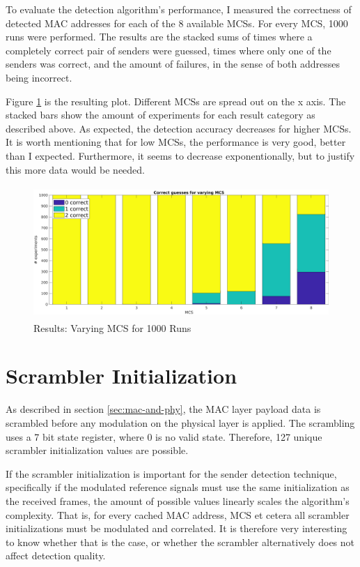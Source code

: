 To evaluate the detection algorithm's performance, I measured the correctness of detected \gls{MAC} addresses for each of the 8 available \glspl{MCS}. For every \gls{MCS}, 1000 runs were performed. The results are the stacked sums of times where a completely correct pair of senders were guessed, times where only one of the senders was correct, and the amount of failures, in the sense of both addresses being incorrect.

Figure \ref{fig:vary_mcs} is the resulting plot. Different \glspl{MCS} are spread out on the x axis. The stacked bars show the amount of experiments for each result category as described above. As expected, the detection accuracy decreases for higher \glspl{MCS}. It is worth mentioning that for low \glspl{MCS}, the performance is very good, better than I expected. Furthermore, it seems to decrease exponentionally, but to justify this more data would be needed.

\begin{figure}[H]
	\centering
	\includegraphics[height=5cm]{gfx/plots/mcs}
	\caption{Results: Varying MCS for 1000 Runs}
	\label{fig:vary_mcs}
\end{figure}



\section{Scrambler Initialization}\label{sec:ex-scrambler}

As described in section \ref{sec:mac-and-phy}, the \gls{MAC} layer payload data is scrambled before any modulation on the physical layer is applied. The scrambling uses a 7 bit state register, where 0 is no valid state. Therefore, 127 unique scrambler initialization values are possible.

If the scrambler initialization is important for the sender detection technique, specifically if the modulated reference signals must use the same initialization as the received frames, the amount of possible values linearly scales the algorithm's complexity. That is, for every cached \gls{MAC} address, \gls{MCS} et cetera all scrambler initializations must be modulated and correlated. It is therefore very interesting to know whether that is the case, or whether the scrambler alternatively does not affect detection quality.\\

